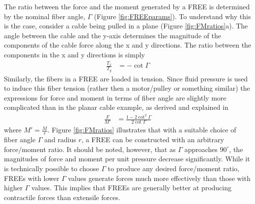 The ratio between the force and the moment generated by a FREE is determined by the nominal fiber angle, $\Gamma$ (Figure \ref{fig:FREEparams}). To understand why this is the case, consider a cable being pulled in a plane (Figure \ref{fig:FMratios}a). The angle between the cable and the y-axis determines the magnitude of the components of the cable force along the x and y directions. The ratio between the components in the x and y directions is simply
\begin{align}
    \frac{T_x}{T_y} &= -\cot{\Gamma}     
\end{align}
Similarly, the fibers in a FREE are loaded in tension. Since fluid pressure is used to induce this fiber tension (rather then a motor/pulley or something similar) the expressions for force and moment in terms of fiber angle are slightly more complicated than in the planar cable example, as derived and explained in \cite{bruder2017model}
\begin{align}
    \frac{F}{M'} &= \frac{1 - 2 \cot^2{\Gamma}}{2 \cot{\Gamma}}
\end{align}
where $M' = \frac{M}{r}$. Figure \ref{fig:FMratios} illustrates that with a suitable choice of fiber angle $\Gamma$ and radius $r$, a FREE can be constructed with an arbitrary force/moment ratio. It should be noted, however, that as $\Gamma$ approaches $90^\circ$, the magnitudes of force and moment per unit pressure decrease significantly. While it is technically possible to choose $\Gamma$ to produce any desired force/moment ratio, FREEs with lower $\Gamma$ values generate forces much more effectively than those with higher $\Gamma$ values. This implies that FREEs are generally better at producing contractile forces than extensile forces.

